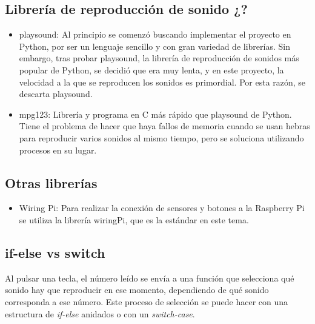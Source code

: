         \subsection{Librería de reproducción de sonido ¿?} %
        \label{sub:LibreriaDeReproduccionDeSonido}

            \begin{itemize}
                \item
                playsound\cite{playsound}: Al principio se comenzó buscando implementar el proyecto en Python, por ser
                un lenguaje sencillo y con gran variedad de librerías. Sin embargo, tras probar playsound, la librería
                de reproducción de sonidos más popular de Python, se decidió que era muy lenta, y en este proyecto, la
                velocidad a la que se reproducen los sonidos es primordial. Por esta razón, se descarta playsound.
                \item
                mpg123\cite{mpg123}: Librería y programa en C más rápido que playsound de Python. Tiene el problema de
                hacer que haya fallos de memoria cuando se usan hebras para reproducir varios sonidos al mismo tiempo,
                pero se soluciona utilizando procesos en su lugar.
            \end{itemize}


        \subsection{Otras librerías} %
        \label{sub:OtrasLibrerias}

            \begin{itemize}
                \item
                Wiring Pi\cite{wiringPi}: Para realizar la conexión de sensores y botones a la Raspberry Pi se utiliza
                la librería wiringPi, que es la estándar en este tema.
            \end{itemize}


        \subsection{if-else vs switch} %
        \label{sub:if-else_vs_switch}

            Al pulsar una tecla, el número leído se envía a una función que selecciona qué sonido hay que reproducir en
            ese momento, dependiendo de qué sonido corresponda a ese número. Este proceso de selección se puede hacer
            con una estructura de \textit{if-else} anidados o con un \textit{switch-case}.\newline


